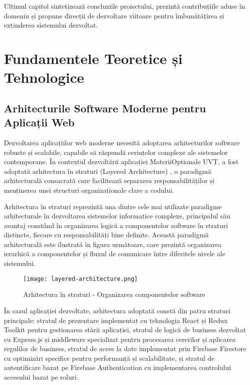 \documentclass[12pt,a4paper]{report}
\begin{document}
Ultimul capitol sintetizează concluziile proiectului, prezintă contribuțiile aduse în domeniu și propune direcții de dezvoltare viitoare pentru îmbunătățirea și extinderea sistemului dezvoltat.

\chapter{Fundamentele Teoretice și Tehnologice}

\section{Arhitecturile Software Moderne pentru Aplicații Web}

Dezvoltarea aplicațiilor web moderne necesită adoptarea arhitecturilor software robuste și scalabile, capabile să răspundă cerințelor complexe ale sistemelor contemporane. În contextul dezvoltării aplicației MateriiOptionale UVT, a fost adoptată arhitectura în straturi (Layered Architecture) \cite{layered-architecture}, o paradigmă arhitecturală consacrată care facilitează separarea responsabilităților și menținerea unei structuri organizaționale clare a codului.

Arhitectura în straturi reprezintă una dintre cele mai utilizate paradigme arhitecturale în dezvoltarea sistemelor informatice complexe, principalul său avantaj constând în organizarea logică a componentelor software în straturi distincte, fiecare cu responsabilități bine definite. Această paradigmă arhitecturală este ilustrată în figura următoare, care prezintă organizarea ierarhică a componentelor și fluxul de comunicare între diferitele nivele ale sistemului.

\begin{figure}[H]
\centering
\texttt{[image: layered-architecture.png]}
\caption{Arhitectura în straturi - Organizarea componentelor software}
\label{fig:layered-architecture}
\end{figure}

În cazul aplicației dezvoltate, arhitectura adoptată constă din patru straturi principale: stratul de prezentare implementat cu tehnologia React și Redux Toolkit pentru gestionarea stării aplicației, stratul de logică de business dezvoltat cu Express.js și middleware specializat pentru procesarea cererilor și aplicarea regulilor de business, stratul de acces la date implementat prin Firebase Firestore cu optimizări specifice pentru performanță și scalabilitate, și stratul de autentificare bazat pe Firebase Authentication cu implementarea controlului accesului bazat pe roluri.
\end{document}
